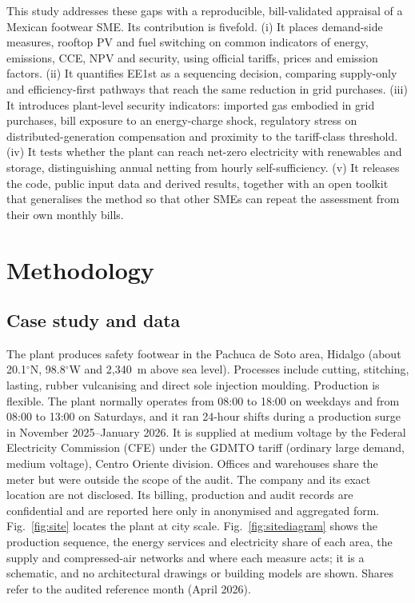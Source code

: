 \documentclass[preprint,12pt,authoryear]{elsarticle}
\begin{document}
This study addresses these gaps with a reproducible, bill-validated appraisal of a Mexican footwear SME. Its contribution is fivefold. (i) It places demand-side measures, rooftop PV and fuel switching on common indicators of energy, emissions, CCE, NPV and security, using official tariffs, prices and emission factors. (ii) It quantifies EE1st as a sequencing decision, comparing supply-only and efficiency-first pathways that reach the same reduction in grid purchases. (iii) It introduces plant-level security indicators: imported gas embodied in grid purchases, bill exposure to an energy-charge shock, regulatory stress on distributed-generation compensation and proximity to the tariff-class threshold. (iv) It tests whether the plant can reach net-zero electricity with renewables and storage, distinguishing annual netting from hourly self-sufficiency. (v) It releases the code, public input data and derived results, together with an open toolkit that generalises the method so that other SMEs can repeat the assessment from their own monthly bills.

\section{Methodology}
\label{sec:method}

\subsection{Case study and data}
The plant produces safety footwear in the Pachuca de Soto area, Hidalgo (about 20.1$^\circ$N, 98.8$^\circ$W and 2,340~m above sea level). Processes include cutting, stitching, lasting, rubber vulcanising and direct sole injection moulding. Production is flexible. The plant normally operates from 08:00 to 18:00 on weekdays and from 08:00 to 13:00 on Saturdays, and it ran 24-hour shifts during a production surge in November 2025--January 2026. It is supplied at medium voltage by the Federal Electricity Commission (CFE) under the GDMTO tariff (ordinary large demand, medium voltage), Centro Oriente division. Offices and warehouses share the meter but were outside the scope of the audit. The company and its exact location are not disclosed. Its billing, production and audit records are confidential and are reported here only in anonymised and aggregated form. Fig.~\ref{fig:site} locates the plant at city scale. Fig.~\ref{fig:sitediagram} shows the production sequence, the energy services and electricity share of each area, the supply and compressed-air networks and where each measure acts; it is a schematic, and no architectural drawings or building models are shown. Shares refer to the audited reference month (April 2026).
\end{document}
